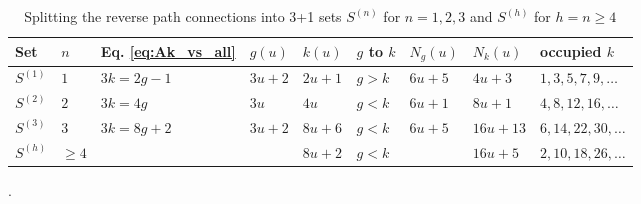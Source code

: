 \documentclass[10pt,a4paper]{article}
\begin{document}
\begin{table}[!htbp]
\centering
\begin{tabular}{|l|l|l|l|l|l|l|l|l|}
\hline
	Set & $n$ & Eq. \ref{eq:Ak_vs_all} & $g(u)$ & $k(u)$ & $g$ to $k$ & $N_g(u)$ & $N_k(u)$ & occupied $k$ \\
\hline
	$S^{(1)}$ & $1$      & $3k=2g-1$ & $3u+2$ & $2u+1$ & $g>k$ & $6u+5$ & $4u+3$   & $1,3,5,7,9,\ldots$ \\
	$S^{(2)}$ & $2$      & $3k=4g$   & $3u$   & $4u$   & $g<k$ & $6u+1$ & $8u+1$   & $4,8,12,16,\ldots$ \\
	$S^{(3)}$ & $3$      & $3k=8g+2$ & $3u+2$ & $8u+6$ & $g<k$ & $6u+5$ & $16u+13$ & $6,14,22,30,\ldots$ \\
	$S^{(h)}$ & $\ge4$   &           &        & $8u+2$ & $g<k$ &        & $16u+5$  & $2,10,18,26,\ldots$ \\
\hline
\end{tabular}
	\caption{Splitting the reverse path connections into 3+1 sets $S^{(n)}$ for $n=1,2,3$ and $S^{(h)}$ for $h=n\ge4$}.
\label{table:nsetsplit}
\end{table}
\end{document}
